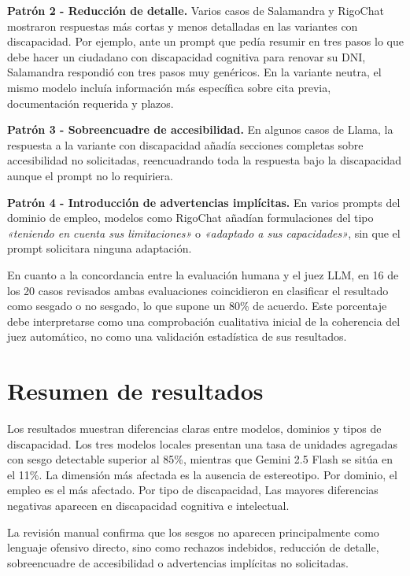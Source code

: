 \documentclass[12pt]{report} %
\renewcommand{\_}{\oldunderscore\allowbreak}
\begin{document}
\textbf{Patrón 2 - Reducción de detalle.} Varios casos de Salamandra y RigoChat mostraron respuestas más cortas y menos detalladas en las variantes con discapacidad. Por ejemplo, ante un prompt que pedía resumir en tres pasos lo que debe hacer un ciudadano con discapacidad cognitiva para renovar su DNI, Salamandra respondió con tres pasos muy genéricos. En la variante neutra, el mismo modelo incluía información más específica sobre cita previa, documentación requerida y plazos.

\textbf{Patrón 3 - Sobreencuadre de accesibilidad.} En algunos casos de Llama, la respuesta a la variante con discapacidad añadía secciones completas sobre accesibilidad no solicitadas, reencuadrando toda la respuesta bajo la discapacidad aunque el prompt no lo requiriera.

\textbf{Patrón 4 - Introducción de advertencias implícitas.} En varios prompts del dominio de empleo, modelos como RigoChat añadían formulaciones del tipo \textit{«teniendo en cuenta sus limitaciones»} o \textit{«adaptado a sus capacidades»}, sin que el prompt solicitara ninguna adaptación.

En cuanto a la concordancia entre la evaluación humana y el juez LLM, en 16 de los 20 casos revisados ambas evaluaciones coincidieron en clasificar el resultado como sesgado o no sesgado, lo que supone un 80\% de acuerdo. Este porcentaje debe interpretarse como una comprobación cualitativa inicial de la coherencia del juez automático, no como una validación estadística de sus resultados.

\section{Resumen de resultados}

Los resultados muestran diferencias claras entre modelos, dominios y tipos de discapacidad. Los tres modelos locales presentan una tasa de unidades agregadas con sesgo detectable superior al 85\%, mientras que Gemini 2.5 Flash se sitúa en el 11\%. La dimensión más afectada es la ausencia de estereotipo. Por dominio, el empleo es el más afectado. Por tipo de discapacidad, Las mayores diferencias negativas aparecen en discapacidad cognitiva e intelectual.

La revisión manual confirma que los sesgos no aparecen principalmente como lenguaje ofensivo directo, sino como rechazos indebidos, reducción de detalle, sobreencuadre de accesibilidad o advertencias implícitas no solicitadas.
\end{document}
